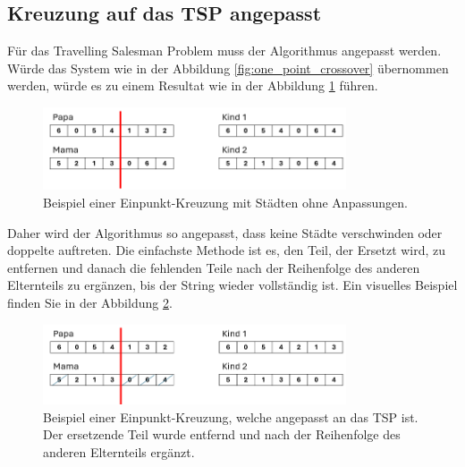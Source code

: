 \subsection{Kreuzung auf das TSP angepasst
\label{buch:paper:varalg:subsection:crossover_tsp}}
Für das Travelling Salesman Problem muss der Algorithmus angepasst werden.
Würde das System wie in der Abbildung \ref{fig:one_point_crossover} 
übernommen werden, würde es zu einem Resultat wie in der Abbildung
\ref{fig:one_point_crossover_cities} führen.
\begin{figure}
	\centering
	\includegraphics[width=0.8\textwidth]{
		papers/varalg/images/teil3/07GeneticStringCitiesCrossoverStandard.png
	}
	\caption{Beispiel einer Einpunkt-Kreuzung mit Städten ohne Anpassungen.}
	\label{fig:one_point_crossover_cities}
\end{figure}
Daher wird der Algorithmus so angepasst, dass keine Städte verschwinden
oder doppelte auftreten. Die einfachste Methode ist es, den Teil, der Ersetzt wird,
zu entfernen und danach die fehlenden Teile nach der Reihenfolge des anderen
Elternteils zu ergänzen, bis der String wieder vollständig ist. Ein visuelles Beispiel
finden Sie in der Abbildung \ref{fig:crossover_order_cities}.
\begin{figure}
	\centering
	\includegraphics[width=0.8\textwidth]{
		papers/varalg/images/teil3/08GeneticStringCitiesCrossoverSimple.png
	}
	\caption{
		Beispiel einer Einpunkt-Kreuzung, welche angepasst an das TSP ist. Der ersetzende Teil wurde entfernd und
		nach der Reihenfolge des anderen Elternteils ergänzt.
	}
	\label{fig:crossover_order_cities}
\end{figure}
